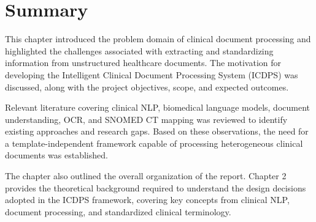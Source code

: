 \section*{Summary}

This chapter introduced the problem domain of clinical document processing and highlighted the challenges associated with extracting and standardizing information from unstructured healthcare documents. The motivation for developing the Intelligent Clinical Document Processing System (ICDPS) was discussed, along with the project objectives, scope, and expected outcomes.

Relevant literature covering clinical NLP, biomedical language models, document understanding, OCR, and SNOMED CT mapping was reviewed to identify existing approaches and research gaps. Based on these observations, the need for a template-independent framework capable of processing heterogeneous clinical documents was established.

The chapter also outlined the overall organization of the report. Chapter 2 provides the theoretical background required to understand the design decisions adopted in the ICDPS framework, covering key concepts from clinical NLP, document processing, and standardized clinical terminology.

